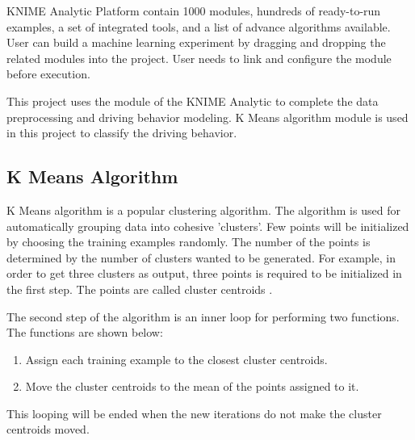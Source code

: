KNIME Analytic Platform contain 1000 modules, hundreds of ready-to-run examples, a set of integrated tools, and a list of advance algorithms available. User can build a machine learning experiment by dragging and dropping the related modules into the project. User needs to link and configure the module before execution.

This project uses the module of the KNIME Analytic to complete the data preprocessing and driving behavior modeling. K Means algorithm module is used in this project to classify the driving behavior.

\subsection{K Means Algorithm}
K Means algorithm is a popular clustering algorithm. The algorithm is used for automatically grouping data into cohesive 'clusters'. Few points will be initialized by choosing the training examples randomly. The number of the points is determined by the number of clusters wanted to be generated. For example, in order to get three clusters as output, three points is required to be initialized in the first step. The points are called cluster centroids \cite{andrew:2016}.

The second step of the algorithm is an inner loop for performing two functions. The functions are shown below:
\begin{enumerate}
\item Assign each training example to the closest cluster centroids.
\item Move the cluster centroids to the mean of the points assigned to it.
\end{enumerate} 

This looping will be ended when the new iterations do not make the cluster centroids moved.

